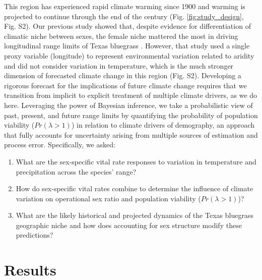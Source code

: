 \documentclass[9pt,twocolumn,twoside,lineno]{pnas-new}
\begin{document}
This region has experienced rapid climate warming since 1900 and warming is projected to continue through the end of the century (Fig. \ref{fig:study_design}, Fig. S2). 
Our previous study showed that, despite evidence for differentiation of climatic niche between sexes, the female niche mattered the most in driving longitudinal range limits of Texas bluegrass \citep{miller2022two}. 
However, that study used a single proxy variable (longitude) to represent environmental variation related to aridity and did not consider variation in temperature, which is the much stronger dimension of forecasted climate change in this region (Fig. S2). 
Developing a rigorous forecast for the implications of future climate change requires that we transition from implicit to explicit treatment of multiple climate drivers, as we do here.
Leveraging the power of Bayesian inference, we take a probabilistic view of past, present, and future range limits by quantifying the probability of population viability ($Pr(\lambda > 1)$) in relation to climate drivers of demography, an approach that fully accounts for uncertainty arising from multiple sources of estimation and process error. %
Specifically, we asked:
\begin{enumerate}
	\item What are the sex-specific vital rate responses to variation in temperature and precipitation across the species' range?
	\item How do sex-specific vital rates combine to determine the influence of climate variation on operational sex ratio and population viability ($Pr(\lambda > 1)$)?
	\item What are the likely historical and projected dynamics of the Texas bluegrass geographic niche and how does accounting for sex structure modify these predictions?
\end{enumerate}

\section*{Results}
\end{document}
